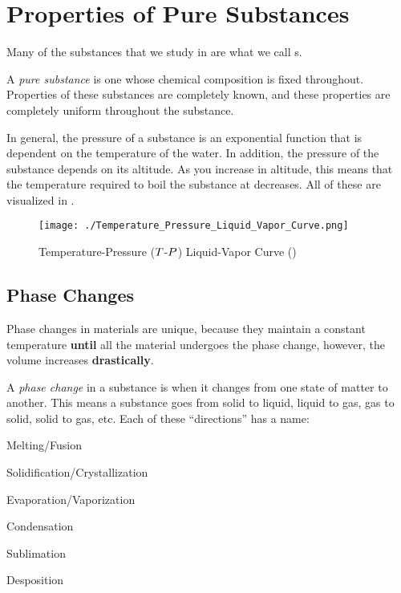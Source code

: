 \section{Properties of Pure Substances}\label{sec:Properties_Pure_Substances}
Many of the substances that we study in  are what we call s.

\begin{definition}\label{def:Pure_Substance}
  A \emph{pure substance} is one whose chemical composition is fixed throughout.
  Properties of these substances are completely known, and these properties are completely uniform throughout the substance.
\end{definition}

In general, the pressure of a substance is an exponential function that is dependent on the temperature of the water.
In addition, the pressure of the substance depends on its altitude.
As you increase in altitude, this means that the temperature required to boil the substance at decreases.
All of these are visualized in .

\begin{figure}[h!tbp]
  \centering
  \texttt{[image: ./Temperature\_Pressure\_Liquid\_Vapor\_Curve.png]}
  \caption{Temperature-Pressure ($T$-$P$) Liquid-Vapor Curve (\cite[pg. 106]{ThermoTextbook})}
  \label{fig:Temp_Pressure_Liquid_Vapor_Curve}
\end{figure}

\subsection{Phase Changes}\label{subsec:Phase_Changes}
Phase changes in materials are unique, because they maintain a constant temperature \textbf{until} all the material undergoes the phase change, however, the volume increases \textbf{drastically}.

\begin{definition}\label{def:Phase_Change}
  A \emph{phase change} in a substance is when it changes from one state of matter to another.
  This means a substance goes from solid to liquid, liquid to gas, gas to solid, solid to gas, etc.
  Each of these ``directions'' has a name:
  \begin{description}[noitemsep]
  \item[Solid to Liquid:] Melting/Fusion
  \item[Liquid to Solid:] Solidification/Crystallization
  \item[Liquid to Gas:] Evaporation/Vaporization
  \item[Gas to Liquid:] Condensation
  \item[Solid to Gas:] Sublimation
  \item[Gas to Solid:] Desposition
  \end{description}
\end{definition}

